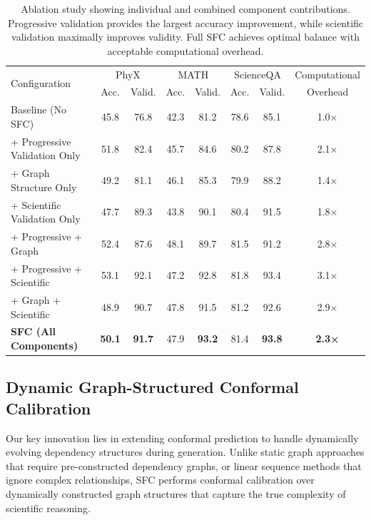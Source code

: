\documentclass{uai2026} %
\theoremstyle{remark}
\theoremstyle{plain}
\theoremstyle{definition}
\begin{document}
\begin{table}[ht]
\centering

\small
\caption{Ablation study showing individual and combined component contributions. Progressive validation provides the largest accuracy improvement, while scientific validation maximally improves validity. Full SFC achieves optimal balance with acceptable computational overhead.}
\label{tab:ablation}
\begin{tabular}{l|cc|cc|cc|c}
\hline
\multirow{2}{*}{Configuration} & \multicolumn{2}{c|}{PhyX} & \multicolumn{2}{c|}{MATH} & \multicolumn{2}{c|}{ScienceQA} & Computational \\
& Acc. & Valid. & Acc. & Valid. & Acc. & Valid. & Overhead \\
\hline
Baseline (No SFC) & 45.8 & 76.8 & 42.3 & 81.2 & 78.6 & 85.1 & 1.0× \\
+ Progressive Validation Only & 51.8 & 82.4 & 45.7 & 84.6 & 80.2 & 87.8 & 2.1× \\
+ Graph Structure Only & 49.2 & 81.1 & 46.1 & 85.3 & 79.9 & 88.2 & 1.4× \\
+ Scientific Validation Only & 47.7 & 89.3 & 43.8 & 90.1 & 80.4 & 91.5 & 1.8× \\
+ Progressive + Graph & 52.4 & 87.6 & 48.1 & 89.7 & 81.5 & 91.2 & 2.8× \\
+ Progressive + Scientific & 53.1 & 92.1 & 47.2 & 92.8 & 81.8 & 93.4 & 3.1× \\
+ Graph + Scientific & 48.9 & 90.7 & 47.8 & 91.5 & 81.2 & 92.6 & 2.9× \\
\hline
\textbf{SFC (All Components)} & \textbf{50.1} & \textbf{91.7} & 47.9 & \textbf{93.2} & 81.4 & \textbf{93.8} & \textbf{2.3×} \\
\hline
\end{tabular}
\end{table}

\subsection{Dynamic Graph-Structured Conformal Calibration}

Our key innovation lies in extending conformal prediction to handle dynamically evolving dependency structures during generation. Unlike static graph approaches that require pre-constructed dependency graphs, or linear sequence methods that ignore complex relationships, SFC performs conformal calibration over dynamically constructed graph structures that capture the true complexity of scientific reasoning. 
\end{document}
